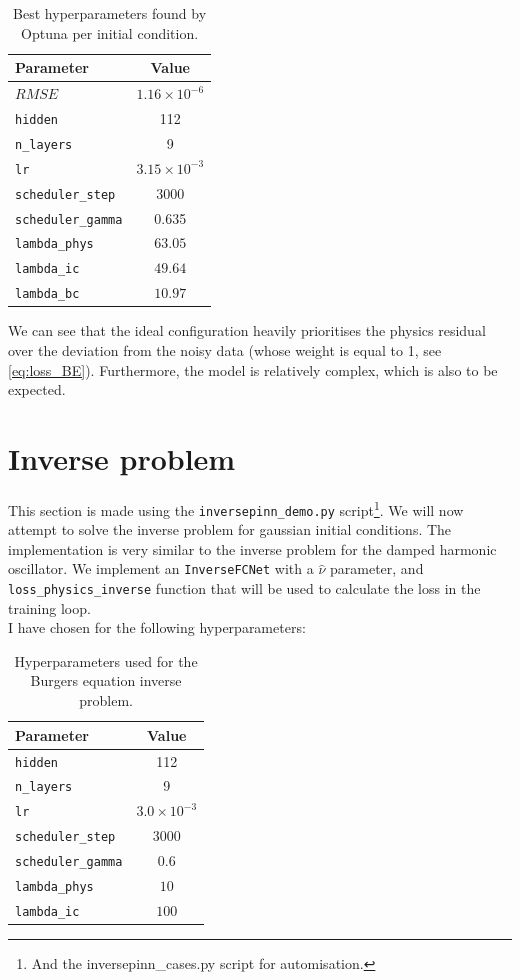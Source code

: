 \documentclass[we,twoside,openright,a4paper,11pt]{uantwerpenbamathesis}
\begin{document}
\begin{table}[H]
\centering
\caption{Best hyperparameters found by Optuna per initial condition.}\label{tab:optuna_best_params_BE}
\begin{tabular}{lc}
\toprule
\textbf{Parameter} & \textbf{Value}\\
\midrule
$RMSE$           & $1.16\times10^{-6}$\\
\midrule
\texttt{hidden}              & 112   \\
\texttt{n\_layers}           & 9     \\
\texttt{lr}                  & $3.15\times10^{-3}$\\
\texttt{scheduler\_step}     & 3000  \\
\texttt{scheduler\_gamma}    & 0.635  \\
\texttt{lambda\_phys}        & $63.05$\\
\texttt{lambda\_ic}          & $49.64$  \\
\texttt{lambda\_bc}          & $10.97$ \\
\bottomrule
\end{tabular}
\end{table}
We can see that the ideal configuration heavily prioritises the physics residual over the deviation from the noisy data (whose weight is equal to 1, see \ref{eq:loss_BE}). Furthermore, the model is relatively complex, which is also to be expected.

\section{Inverse problem}
This section is made using the \verb|inversepinn_demo.py| script\footnote{And the inversepinn\_cases.py script for automisation.}. We will now attempt to solve the inverse problem for gaussian initial conditions. The implementation is very similar to the inverse problem for the damped harmonic oscillator. We implement an \verb|InverseFCNet| with a $\hat\nu$ parameter, and \verb|loss_physics_inverse| function that will be used to calculate the loss in the training loop.\\

I have chosen for the following hyperparameters:
\begin{table}[H]
\centering
\caption{Hyperparameters used for the Burgers equation inverse problem.}\label{tab:inverse_hyperparameters_BE}
\begin{tabular}{lc}
\toprule
\textbf{Parameter} & \textbf{Value}\\
\midrule
\texttt{hidden}              & 112   \\
\texttt{n\_layers}           & 9     \\
\texttt{lr}                  & $3.0\times10^{-3}$\\
\texttt{scheduler\_step}     & 3000  \\
\texttt{scheduler\_gamma}    & 0.6  \\
\texttt{lambda\_phys}        & $10$\\
\texttt{lambda\_ic}          & $100$  \\
\bottomrule
\end{tabular}
\end{table}
 
\end{document}
